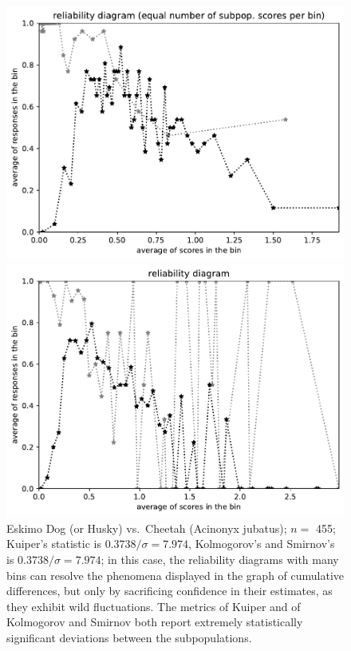 \documentclass{article}
\newlength{\imsize}
\begin{document}
\begin{figure}
\begin{centering}
\parbox{\imsize}{\includegraphics[width=\imsize]
{../codes/unweighted/nll-1-248-Eskimo-dog-husky_293-cheetah-chetah-Acinonyx-jubatusequisamps50.pdf}}
\quad\quad
\parbox{\imsize}{\includegraphics[width=\imsize]
{../codes/unweighted/nll-1-248-Eskimo-dog-husky_293-cheetah-chetah-Acinonyx-jubatusequiscore50.pdf}}

\end{centering}
\caption{Eskimo Dog (or Husky) vs.\ Cheetah (Acinonyx jubatus); $n =$ 455;
         Kuiper's statistic is $0.3738 / \sigma = 7.974$,
         Kolmogorov's and Smirnov's is $0.3738 / \sigma = 7.974$;
         in this case, the reliability diagrams with many bins can resolve
         the phenomena displayed in the graph of cumulative differences,
         but only by sacrificing confidence in their estimates,
         as they exhibit wild fluctuations.
         The metrics of Kuiper and of Kolmogorov and Smirnov both report
         extremely statistically significant deviations
         between the subpopulations.
}
\label{Eskimo-dog-husky_cheetah}
\end{figure}
\end{document}
